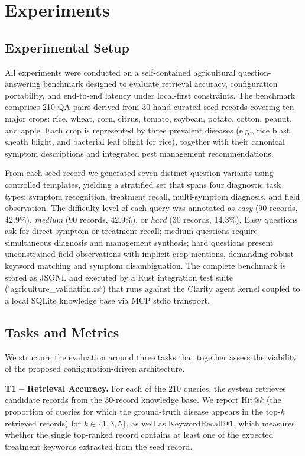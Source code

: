 \section{Experiments}
\label{sec:experiments}

\subsection{Experimental Setup}

All experiments were conducted on a self-contained agricultural question-answering benchmark designed to evaluate retrieval accuracy, configuration portability, and end-to-end latency under local-first constraints. The benchmark comprises 210 QA pairs derived from 30 hand-curated seed records covering ten major crops: rice, wheat, corn, citrus, tomato, soybean, potato, cotton, peanut, and apple. Each crop is represented by three prevalent diseases (e.g., rice blast, sheath blight, and bacterial leaf blight for rice), together with their canonical symptom descriptions and integrated pest management recommendations.

From each seed record we generated seven distinct question variants using controlled templates, yielding a stratified set that spans four diagnostic task types: symptom recognition, treatment recall, multi-symptom diagnosis, and field observation. The difficulty level of each query was annotated as \textit{easy} (90 records, 42.9\%), \textit{medium} (90 records, 42.9\%), or \textit{hard} (30 records, 14.3\%). Easy questions ask for direct symptom or treatment recall; medium questions require simultaneous diagnosis and management synthesis; hard questions present unconstrained field observations with implicit crop mentions, demanding robust keyword matching and symptom disambiguation. The complete benchmark is stored as JSONL and executed by a Rust integration test suite (`agriculture_validation.rs`) that runs against the Clarity agent kernel coupled to a local SQLite knowledge base via MCP stdio transport.

\subsection{Tasks and Metrics}

We structure the evaluation around three tasks that together assess the viability of the proposed configuration-driven architecture.

\textbf{T1 -- Retrieval Accuracy.} For each of the 210 queries, the system retrieves candidate records from the 30-record knowledge base. We report Hit@$k$ (the proportion of queries for which the ground-truth disease appears in the top-$k$ retrieved records) for $k \in \{1, 3, 5\}$, as well as KeywordRecall@1, which measures whether the single top-ranked record contains at least one of the expected treatment keywords extracted from the seed record.

